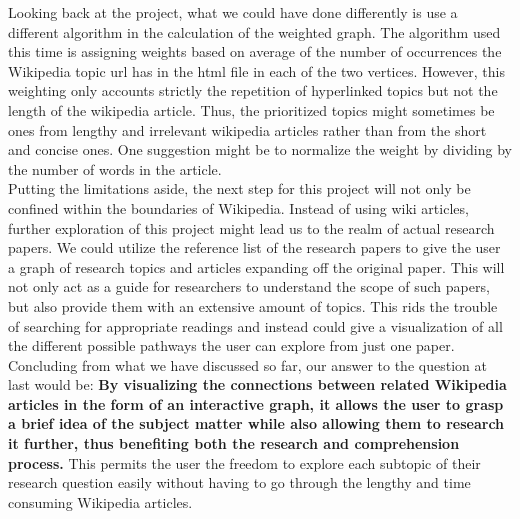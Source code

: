 \documentclass[fontsize=11pt]{article}
\begin{document}
Looking back at the project, what we could have done differently is use a different algorithm in the calculation of the weighted graph. The algorithm used this time is assigning weights based on average of the number of occurrences the Wikipedia topic url has in the html file in each of the two vertices. However, this weighting only accounts strictly the repetition of hyperlinked topics but not the length of the wikipedia article. Thus, the prioritized topics might sometimes be ones from lengthy and irrelevant wikipedia articles rather than from the short and concise ones. One suggestion might be to normalize the weight by dividing by the number of words in the article.\\

Putting the limitations aside, the next step for this project will not only be confined within the boundaries of Wikipedia. Instead of using wiki articles, further exploration of this project might lead us to the realm of actual research papers. We could utilize the reference list of the research papers to give the user a graph of research topics and articles expanding off the original paper. This will not only act as a guide for researchers to understand the scope of such papers, but also provide them with an extensive amount of topics. This rids the trouble of searching for appropriate readings and instead could give a visualization of all the different possible pathways the user can explore from just one paper. \\

Concluding from what we have discussed so far, our answer to the question at last would be: \textbf{By visualizing the connections between related Wikipedia articles in the form of an interactive graph, it allows the user to grasp a brief idea of the subject matter while also allowing them to research it further, thus benefiting both the research and comprehension process.} This permits the user the freedom to explore each subtopic of their research question easily without having to go through the lengthy and time consuming Wikipedia articles.

\newpage
\end{document}
